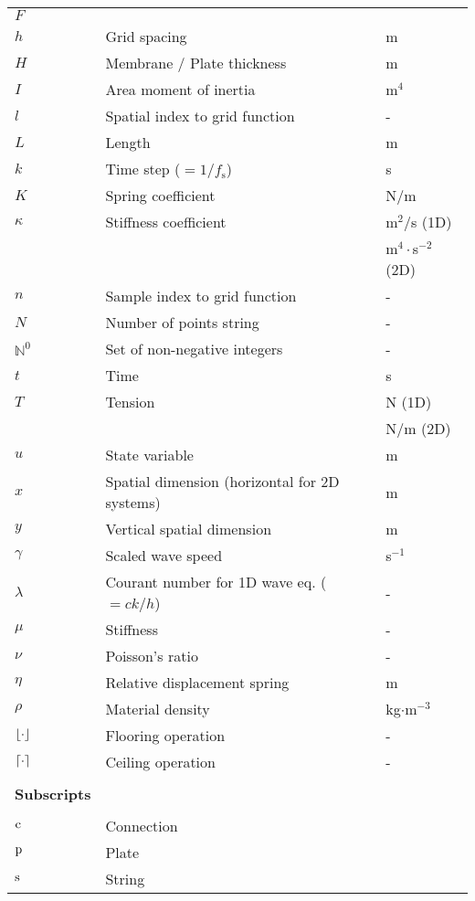 {\begin{longtable}{ p{2cm} p{6.5cm} p{2.5cm}  }
 $F$ &  & \\
 $h$ & Grid spacing & m \\ 
 $H$ & Membrane / Plate thickness & m \\ 
 $I$ & Area moment of inertia & m$^4$\\
 $l$ & Spatial index to grid function & - \\
 $L$ & Length & m\\
 $k$ & Time step ($=1/f_\text{s}$) & s\\
 $K$ & Spring coefficient & N/m\\
 $\kappa$ & Stiffness coefficient & m$^2$/s (1D)\\
 & & m$^4\cdot$s$^{-2}$ (2D)\\
 $n$ & Sample index to grid function & - \\
 $N$ & Number of points string & -\\
 $\mathbb{N}^0$ & Set of non-negative integers %
 & -\\
 $t$ & Time & s\\
 $T$ & Tension & N (1D)\\
 & & N/m (2D)\\
 $u$ & State variable & m\\ 
 $x$ & Spatial dimension (horizontal for 2D systems) & m\\
 $y$ & Vertical spatial dimension & m\\
 $\gamma$ & Scaled wave speed & s$^{-1}$\\
 $\lambda$ & Courant number for 1D wave eq. ($=ck/h$) & -\\
 $\mu$ & Stiffness  & -\\
 $\nu$ & Poisson's ratio & -\\
 $\eta$ & Relative displacement spring & m\\
 $\rho$ & Material density & kg$\cdot$m$^{-3}$\\
 $\floor[\cdot]$ & Flooring operation & - \\
 $\ceil[\cdot]$ & Ceiling operation & -\\
 \\\hline
 {\bf Subscripts}\\\hline
 \\
 $\text{c}$ & Connection &\\
 $\text{p}$ & Plate & \\
 $\text{s}$ & String &
\end{longtable}}